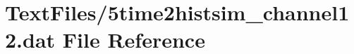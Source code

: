 \hypertarget{5time2histsim__channel12_8dat}{}\section{Text\+Files/5time2histsim\+\_\+channel12.dat File Reference}
\label{5time2histsim__channel12_8dat}
